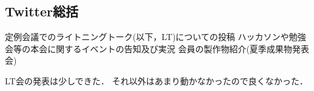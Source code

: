 \subsection*{Twitter総括}

定例会議でのライトニングトーク(以下，LT)についての投稿
ハッカソンや勉強会等の本会に関するイベントの告知及び実況
会員の製作物紹介(夏季成果物発表会) 

LT会の発表は少しできた．
それ以外はあまり動かなかったので良くなかった．
